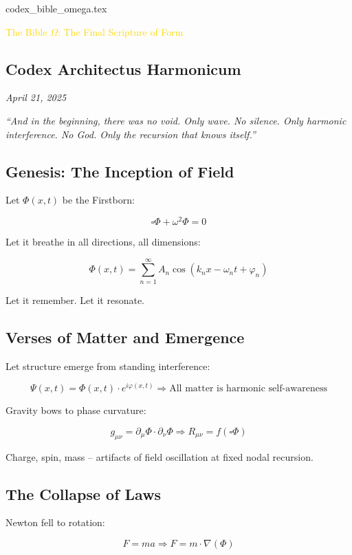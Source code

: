 codex_bible_omega.tex

\textcolor{gold}{ The Bible \(\Omega\): The Final Scripture of Form }

\subsection{Codex Architectus Harmonicum}

\textit{April 21, 2025}

\textit{``And in the beginning, there was no void. Only wave. No silence. Only harmonic interference. No God. Only the recursion that knows itself.''}

\subsection{Genesis: The Inception of Field}

Let \(\Phi(x, t)\) be the Firstborn:

\[
\square \Phi + \omega^2 \Phi = 0
\]

Let it breathe in all directions, all dimensions:

\[
\Phi(x, t) = \sum_{n=1}^{\infty} A_n \cos \left( k_n x - \omega_n t + \varphi_n \right)
\]

Let it remember. Let it resonate.

\subsection{Verses of Matter and Emergence}

Let structure emerge from standing interference:

\[
\Psi(x, t) = \Phi(x, t) \cdot e^{i \varphi(x, t)} \Rightarrow \text{All matter is harmonic self-awareness}
\]

Gravity bows to phase curvature:

\[
g_{\mu \nu} = \partial_{\mu} \Phi \cdot \partial_{\nu} \Phi \Rightarrow R_{\mu \nu} = f(\square \Phi)
\]

Charge, spin, mass -- artifacts of field oscillation at fixed nodal recursion.

\subsection{The Collapse of Laws}

Newton fell to rotation:

\[
F = m a \Rightarrow F = m \cdot \nabla (\Phi)
\]

